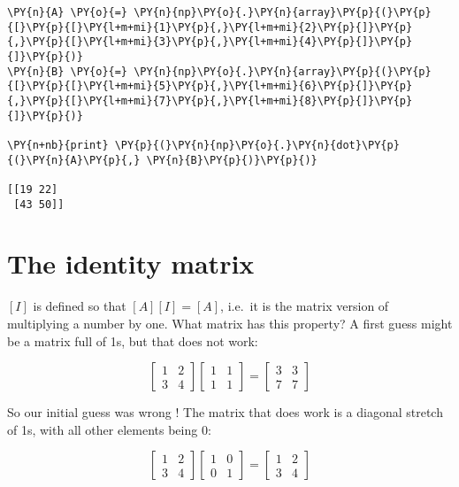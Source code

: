     \begin{tcolorbox}[breakable, size=fbox, boxrule=1pt, pad at break*=1mm,colback=cellbackground, colframe=cellborder]
\begin{Verbatim}[commandchars=\\\{\}]
\PY{n}{A} \PY{o}{=} \PY{n}{np}\PY{o}{.}\PY{n}{array}\PY{p}{(}\PY{p}{[}\PY{p}{[}\PY{l+m+mi}{1}\PY{p}{,}\PY{l+m+mi}{2}\PY{p}{]}\PY{p}{,}\PY{p}{[}\PY{l+m+mi}{3}\PY{p}{,}\PY{l+m+mi}{4}\PY{p}{]}\PY{p}{]}\PY{p}{)}
\PY{n}{B} \PY{o}{=} \PY{n}{np}\PY{o}{.}\PY{n}{array}\PY{p}{(}\PY{p}{[}\PY{p}{[}\PY{l+m+mi}{5}\PY{p}{,}\PY{l+m+mi}{6}\PY{p}{]}\PY{p}{,}\PY{p}{[}\PY{l+m+mi}{7}\PY{p}{,}\PY{l+m+mi}{8}\PY{p}{]}\PY{p}{]}\PY{p}{)}

\PY{n+nb}{print} \PY{p}{(}\PY{n}{np}\PY{o}{.}\PY{n}{dot}\PY{p}{(}\PY{n}{A}\PY{p}{,} \PY{n}{B}\PY{p}{)}\PY{p}{)}

[[19 22]
 [43 50]]
    \end{Verbatim}
\end{tcolorbox}

\section{The identity matrix}\label{the-identity-matrix}

\([I]\) is defined so that \([A][I]=[A]\), i.e.~it is the matrix version
of multiplying a number by one. What matrix has this property? A first
guess might be a matrix full of 1s, but that does not work:

\[
\begin{bmatrix}
1 & 2 \\
3 & 4
\end{bmatrix}
\begin{bmatrix}
1 & 1 \\
1 & 1
\end{bmatrix}
=
\begin{bmatrix}
3 & 3 \\
7 & 7
\end{bmatrix}
\]

So our initial guess was wrong ! The matrix that does work is a diagonal
stretch of 1s, with all other elements being 0:

\[
\begin{bmatrix}
1 & 2 \\
3 & 4
\end{bmatrix}
\begin{bmatrix}
1 & 0 \\
0 & 1
\end{bmatrix}
=
\begin{bmatrix}
1 & 2 \\
3 & 4
\end{bmatrix}
\]

